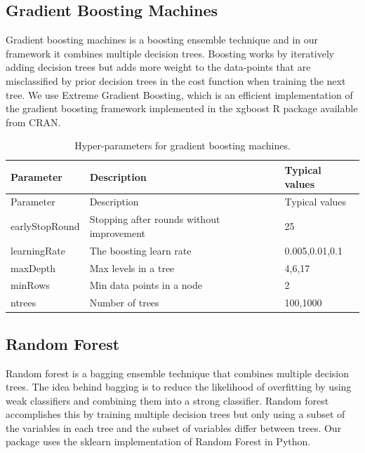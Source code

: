 \documentclass[11pt]{book}
\theoremstyle{definition}
\theoremstyle{definition}
\theoremstyle{definition}
\theoremstyle{remark}
\begin{document}
\subsection{Gradient Boosting
Machines}\label{gradient-boosting-machines}

Gradient boosting machines is a boosting ensemble technique and in our
framework it combines multiple decision trees. Boosting works by
iteratively adding decision trees but adds more weight to the
data-points that are misclassified by prior decision trees in the cost
function when training the next tree. We use Extreme Gradient Boosting,
which is an efficient implementation of the gradient boosting framework
implemented in the xgboost R package available from CRAN.
 

\begin{longtable}[]{@{}lll@{}}
\caption{\label{tab:gbmParameters} Hyper-parameters for gradient boosting
machines.}\tabularnewline
\toprule
Parameter & Description & Typical values\tabularnewline
\midrule
\endfirsthead
\toprule
Parameter & Description & Typical values\tabularnewline
\midrule
\endhead
earlyStopRound & Stopping after rounds without improvement &
25\tabularnewline
learningRate & The boosting learn rate & 0.005,0.01,0.1\tabularnewline
maxDepth & Max levels in a tree & 4,6,17\tabularnewline
minRows & Min data points in a node & 2\tabularnewline
ntrees & Number of trees & 100,1000\tabularnewline
\bottomrule
\end{longtable}

\subsection{Random Forest}\label{random-forest}

Random forest is a bagging ensemble technique that combines multiple
decision trees. The idea behind bagging is to reduce the likelihood of
overfitting by using weak classifiers and combining them into a strong
classifier. Random forest accomplishes this by training multiple
decision trees but only using a subset of the variables in each tree and
the subset of variables differ between trees. Our package uses the
sklearn implementation of Random Forest in Python. 
 
\end{document}
